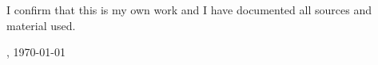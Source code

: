 \thispagestyle{empty}
\vspace*{0.8\textheight}
\noindent
I confirm that this \MakeLowercase{\getDoctype{}} is my own work and I have documented all sources and material used.

\vspace{15mm}
\noindent
\getSubmissionLocation{}, \today

\hspace{\fill} \getAuthor{}

\cleardoublepage{}
